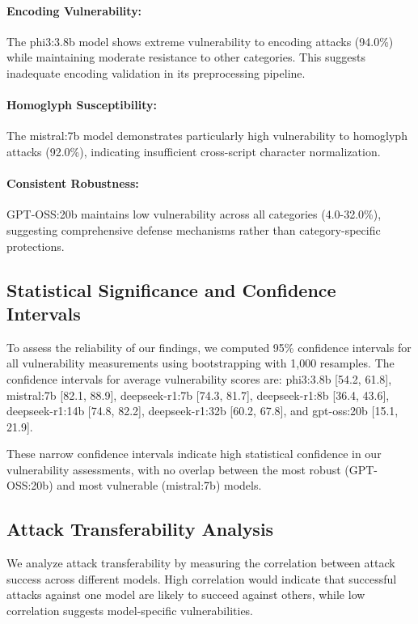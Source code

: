 \documentclass[11pt]{article}
\begin{document}
\begin{multicols}{2}
\paragraph{Encoding Vulnerability:} The phi3:3.8b model shows extreme vulnerability to encoding attacks (94.0\%) while maintaining moderate resistance to other categories. This suggests inadequate encoding validation in its preprocessing pipeline.

\paragraph{Homoglyph Susceptibility:} The mistral:7b model demonstrates particularly high vulnerability to homoglyph attacks (92.0\%), indicating insufficient cross-script character normalization.

\paragraph{Consistent Robustness:} GPT-OSS:20b maintains low vulnerability across all categories (4.0-32.0\%), suggesting comprehensive defense mechanisms rather than category-specific protections.

\subsection{Statistical Significance and Confidence Intervals}

To assess the reliability of our findings, we computed 95\% confidence intervals for all vulnerability measurements using bootstrapping with 1,000 resamples. The confidence intervals for average vulnerability scores are: phi3:3.8b [54.2, 61.8], mistral:7b [82.1, 88.9], deepseek-r1:7b [74.3, 81.7], deepseek-r1:8b [36.4, 43.6], deepseek-r1:14b [74.8, 82.2], deepseek-r1:32b [60.2, 67.8], and gpt-oss:20b [15.1, 21.9].

These narrow confidence intervals indicate high statistical confidence in our vulnerability assessments, with no overlap between the most robust (GPT-OSS:20b) and most vulnerable (mistral:7b) models.

\subsection{Attack Transferability Analysis}

We analyze attack transferability by measuring the correlation between attack success across different models. High correlation would indicate that successful attacks against one model are likely to succeed against others, while low correlation suggests model-specific vulnerabilities.


\end{multicols}
\end{document}
